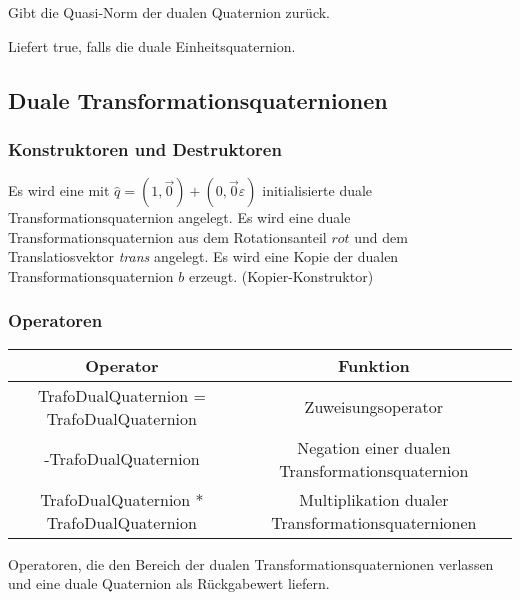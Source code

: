 \descr
{
Gibt die Quasi-Norm der dualen Quaternion zurück.
}

\descr
{
Liefert true, falls die duale Einheitsquaternion.
}
\subsection{Duale Transformationsquaternionen}
\hypertarget{TrafoDualQuaternion}{}
\subsubsection{Konstruktoren und Destruktoren}
\descr
{
Es wird eine mit $\hat{q}=(1,\vec{0})+(0,\vec{0}\varepsilon)$ initialisierte duale
Transformationsquaternion angelegt.
}
\descr
{
Es wird eine duale Transformationsquaternion aus dem Rotationsanteil $rot$ und dem
Translatiosvektor \textit{trans} angelegt.
}
\descr
{
Es wird eine Kopie der dualen Transformationsquaternion $b$ erzeugt.
(Kopier-Konstruktor)
}

\subsubsection{Operatoren}
\begin{tabular}{|c|c|}
\hline
Operator & Funktion\\ 
\hline
TrafoDualQuaternion = TrafoDualQuaternion & Zuweisungsoperator\\
-TrafoDualQuaternion & Negation einer dualen
Transformationsquaternion\\
\hline
TrafoDualQuaternion * TrafoDualQuaternion & Multiplikation dualer
Transformationsquaternionen\\
\hline
\end{tabular}

Operatoren, die den Bereich der dualen Transformationsquaternionen verlassen und eine
duale Quaternion als Rückgabewert liefern.

